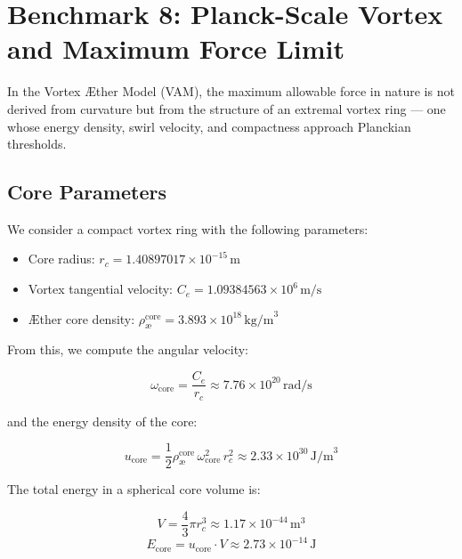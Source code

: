 \section{Benchmark 8: Planck-Scale Vortex and Maximum Force Limit}

In the Vortex Æther Model (VAM), the maximum allowable force in nature is not derived from curvature but from the structure of an extremal vortex ring — one whose energy density, swirl velocity, and compactness approach Planckian thresholds.

\subsection{Core Parameters}

We consider a compact vortex ring with the following parameters:

\begin{itemize}
    \item Core radius: \( r_c = 1.40897017 \times 10^{-15} \, \text{m} \)
    \item Vortex tangential velocity: \( C_e = 1.09384563 \times 10^{6} \, \text{m/s} \)
    \item Æther core density: \( \rho_\text{\ae}^\text{core} = 3.893 \times 10^{18} \, \text{kg/m}^3 \)
\end{itemize}

From this, we compute the angular velocity:

\begin{equation}
\omega_{\text{core}} = \frac{C_e}{r_c} \approx 7.76 \times 10^{20} \, \text{rad/s}
\end{equation}

and the energy density of the core:

\begin{equation}
u_{\text{core}} = \frac{1}{2} \rho_\text{\ae}^\text{core} \, \omega_{\text{core}}^2 \, r_c^2 \approx 2.33 \times 10^{30} \, \text{J/m}^3
\end{equation}

The total energy in a spherical core volume is:

\begin{equation}
V = \frac{4}{3} \pi r_c^3 \approx 1.17 \times 10^{-44} \, \text{m}^3
\end{equation}
\begin{equation}
E_{\text{core}} = u_{\text{core}} \cdot V \approx 2.73 \times 10^{-14} \, \text{J}
\end{equation}

